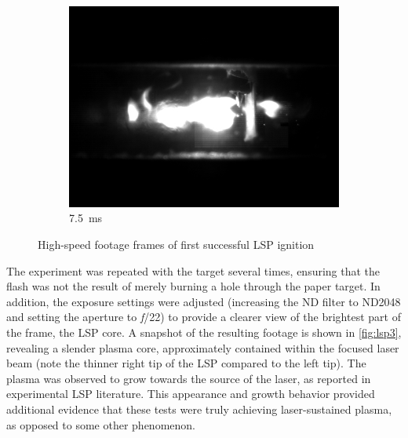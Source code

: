 \begin{figure}[h]
\begin{subfigure}[t]{0.32\textwidth}
                \end{subfigure}
                \hfill
                \begin{subfigure}[t]{0.32\textwidth}
                    \centering
                    \includegraphics[width=\textwidth]{assets/3 design/LSP1_frames/75.jpg}
                    \caption{7.5~ms}
                    \label{fig:lsp1_75}
                \end{subfigure}
                \caption{High-speed footage frames of first successful LSP ignition}
                \label{fig:lsp1}
            \end{figure}

            The experiment was repeated with the target several times, ensuring that the flash was not the result of merely burning a hole through the paper target. In addition, the exposure settings were adjusted (increasing the ND filter to ND2048 and setting the aperture to \textit{f}/22) to provide a clearer view of the brightest part of the frame, the LSP core. A snapshot of the resulting footage is shown in \autoref{fig:lsp3}, revealing a slender plasma core, approximately contained within the focused laser beam (note the thinner right tip of the LSP compared to the left tip). The plasma was observed to grow towards the source of the laser, as reported in experimental LSP literature. This appearance and growth behavior provided additional evidence that these tests were truly achieving laser-sustained plasma, as opposed to some other phenomenon.

